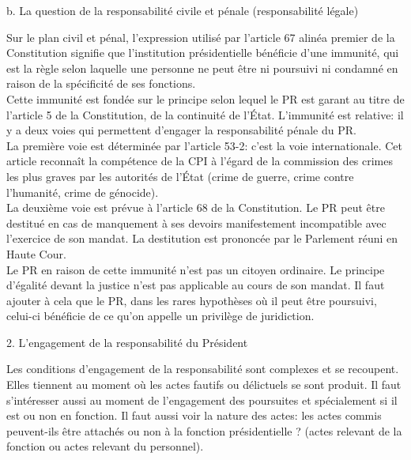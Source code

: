 \documentclass[12pt, a4paper, openany]{book}
\begin{document}
b. La question de la responsabilité civile et pénale (responsabilité légale)


Sur le plan civil et pénal, l'expression utilisé par l'article 67 alinéa premier de la Constitution signifie que l'institution présidentielle bénéficie d'une immunité, qui est la règle selon laquelle une personne ne peut être ni poursuivi ni condamné en raison de la spécificité de ses fonctions. \\
Cette immunité est fondée sur le principe selon lequel le PR est garant au titre de l'article 5 de la Constitution, de la continuité de l'État. L'immunité est relative: il y a deux voies qui permettent d'engager la responsabilité pénale du PR. \\
La première voie est déterminée par l'article 53-2: c'est la voie internationale. Cet article reconnaît la compétence de la CPI à l'égard de la commission des crimes les plus graves par les autorités de l'État (crime de guerre, crime contre l'humanité, crime de génocide). \\
La deuxième voie est prévue à l'article 68 de la Constitution. Le PR peut être destitué en cas de manquement à ses devoirs manifestement incompatible avec l'exercice de son mandat. La destitution est prononcée par le Parlement réuni en Haute Cour. \\
Le PR en raison de cette immunité n'est pas un citoyen ordinaire. Le principe d'égalité devant la justice n'est pas applicable au cours de son mandat. Il faut ajouter à cela que le PR, dans les rares hypothèses où il peut être poursuivi, celui-ci bénéficie de ce qu'on appelle un privilège de juridiction. 


2. L'engagement de la responsabilité du Président


Les conditions d'engagement de la responsabilité sont complexes et se recoupent. Elles tiennent au moment où les actes fautifs ou délictuels se sont produit. Il faut s'intéresser aussi au moment de l'engagement des poursuites et spécialement si il est ou non en fonction. Il faut aussi voir la nature des actes: les actes commis peuvent-ils être attachés ou non à la fonction présidentielle ? (actes relevant de la fonction ou actes relevant du personnel).
\end{document}
